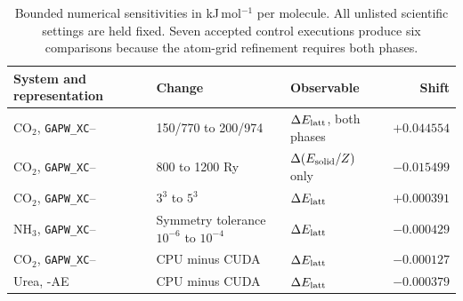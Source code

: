 \begin{table}[t]
\centering
\caption{Bounded numerical sensitivities in kJ\,mol$^{-1}$ per molecule. All unlisted scientific settings are held fixed. Seven accepted control executions produce six comparisons because the atom-grid refinement requires both phases.}
\label{tab:x23_controls_si}
\begin{tabular}{@{}p{}p{}p{}r@{}}
\toprule
System and representation & Change & Observable & Shift \\
\midrule
CO$_2$, \texttt{GAPW\_XC}--\GTH{} & 150/770 to 200/974 & $\Delta E_{\rm latt}$, both phases & $+0.044554$ \\
CO$_2$, \texttt{GAPW\_XC}--\GTH{} & 800 to 1200 Ry & $\Delta(E_{\rm solid}/Z)$ only & $-0.015499$ \\
CO$_2$, \texttt{GAPW\_XC}--\GTH{} & $3^3$ to $5^3$ & $\Delta E_{\rm latt}$ & $+0.000391$ \\
NH$_3$, \texttt{GAPW\_XC}--\GTH{} & Symmetry tolerance $10^{-6}$ to $10^{-4}$ & $\Delta E_{\rm latt}$ & $-0.000429$ \\
CO$_2$, \texttt{GAPW\_XC}--\GTH{} & CPU minus CUDA & $\Delta E_{\rm latt}$ & $-0.000127$ \\
Urea, \GAPW{}-AE & CPU minus CUDA & $\Delta E_{\rm latt}$ & $-0.000379$ \\
\bottomrule
\end{tabular}
\end{table}
